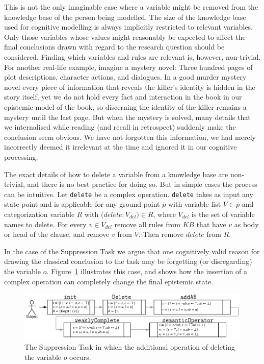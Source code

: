 \documentclass[
11pt, %
english, %
singlespacing, %
headsepline, %
]{MastersDoctoralThesis} %
\begin{document}
This is not the only imaginable case where a variable might be removed from the knowledge base of the person being modelled. The size of the knowledge base used for cognitive modelling is always implicitly restricted to relevant variables. Only those variables whose values might reasonably be expected to affect the final conclusions drawn with regard to the research question should be considered. Finding which variables and rules are relevant is, however, non-trivial. For another real-life example, imagine a mystery novel: Three hundred pages of plot descriptions, character actions, and dialogues. In a good murder mystery novel every piece of information that reveals the killer's identity is hidden in the story itself, yet we do not hold every fact and interaction in the book in our epistemic model of the book, so discerning the identity of the killer remains a mystery until the last page. But when the mystery is solved, many details that we internalised while reading (and recall in retrospect) suddenly make the conclusion seem obvious. We have not forgotten this information, we had merely incorrectly deemed it irrelevant at the time and ignored it in our cognitive processing.

The exact details of how to delete a variable from a knowledge base are non-trivial, and there is no best practice for doing so. But in simple cases the process can be intuitive. Let \texttt{delete} be a complex operation. \texttt{delete} takes as input any state point and is applicable for any ground point $\bar{p}$ with variable list $V \in \bar{p}$ and categorization variable $R$ with ($delete:V_{del}) \in R$, where $V_{del}$ is the set of variable names to delete. For every $v \in V_{del}$ remove all rules from $KB$ that have $v$ as body or head of the clause, and remove $v$ from $V$. Then remove $delete$ from $R$.

In the case of the Suppression Task we argue that one cognitively valid reason for drawing the classical conclusion to the task may be forgetting (or disregarding) the variable $o$. Figure~\ref{fig:supmod} illustrates this case, and shows how the insertion of a complex operation can completely change the final epistemic state.

\begin{figure}
\begin{center}
\includegraphics[width=0.85\linewidth]{suppressionSCP_mod}
\end{center}

\caption{The Suppression Task in which the additional operation of deleting the variable $o$ occurs.}
\label{fig:supmod}
\end{figure}
\end{document}
